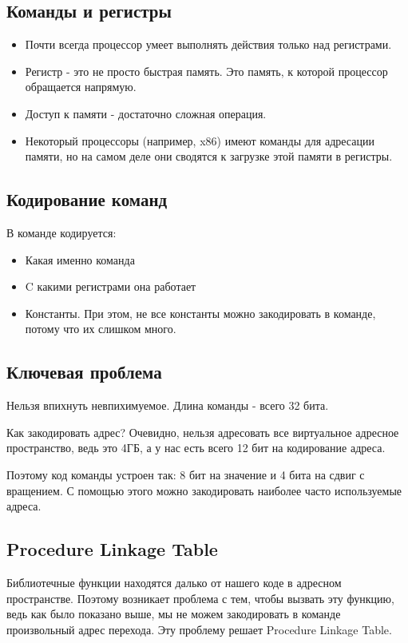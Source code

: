 \subsection{Команды и регистры}

\begin{itemize}
	\item Почти всегда процессор умеет выполнять действия только над регистрами. 
	\item Регистр - это не просто быстрая память. Это память, к которой процессор
	обращается напрямую.
	\item Доступ к памяти  - достаточно сложная операция.
	\item Некоторый процессоры (например, x86) имеют команды для адресации памяти, но на самом деле они сводятся к загрузке этой памяти в регистры.
\end{itemize}

\subsection{Кодирование команд}

В команде кодируется:
\begin{itemize}
	\item Какая именно команда
	\item C какими регистрами она работает
	\item Константы. При этом, не все константы можно закодировать
	в команде, потому что их слишком много. 
\end{itemize}

\subsection{Ключевая проблема}

Нельзя впихнуть невпихимуемое. Длина команды - всего 32 бита.

Как закодировать адрес? Очевидно, нельзя адресовать все виртуальное адресное пространство,
ведь это 4ГБ, а у нас есть всего 12 бит на кодирование адреса. \

Поэтому код команды устроен так: 8 бит на значение и 4 бита на сдвиг с вращением. С помощью этого можно закодировать наиболее часто используемые адреса.

\subsection{Procedure Linkage Table}

Библиотечные функции находятся далько от нашего коде в адресном пространстве. Поэтому
возникает проблема с тем, чтобы вызвать эту функцию, ведь как было показано выше, мы не
можем закодировать в команде произвольный адрес перехода. Эту проблему решает Procedure Linkage Table. 

